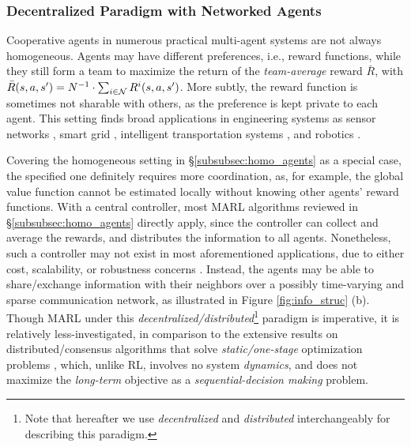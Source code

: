 

 
\subsubsection{Decentralized Paradigm with Networked Agents}\label{subsubsec:networked_paradigm}
 
Cooperative agents in  numerous  
practical multi-agent systems are not always  homogeneous. Agents may have different preferences, i.e., reward functions, while  they still form a team to maximize the return of the \emph{team-average} reward $\bar R$, with $\bar R(s,a,s')=N^{-1}\cdot\sum_{i\in\mathcal{N}}R^i(s,a,s')$. More subtly, the reward function is sometimes not sharable with others, as the preference is kept private to each agent.  
This setting finds broad applications in  engineering systems as sensor networks  \cite{rabbat2004distributed},  smart grid \cite{dall2013distributed,zhang2018dynamicpower}, intelligent transportation systems \cite{adler2002cooperative,zhang2018dynamic}, and robotics \cite{corke2005networked}. 


Covering the homogeneous  setting in \S\ref{subsubsec:homo_agents} as a special case, the specified one definitely  requires more coordination, as, for example, the  global value function  cannot be estimated locally without knowing other agents' reward functions. With a central controller, most MARL algorithms reviewed in   \S\ref{subsubsec:homo_agents}  directly apply, since the controller can collect and average the rewards, and distributes the information to all agents. Nonetheless,  such a controller may not exist in 
most aforementioned applications,  due to  either cost, scalability, or robustness concerns \cite{rabbat2004distributed,dall2013distributed,zhang2018distributedauto}. 
Instead,   the agents may be able to share/exchange information with their neighbors over  a possibly time-varying and sparse communication network, as  illustrated in    Figure \ref{fig:info_struc} (b). 
Though MARL under this \emph{decentralized/distributed}\footnote{Note that hereafter  we use \emph{decentralized} and \emph{distributed} interchangeably for describing this paradigm. } paradigm  is   imperative, it is  relatively less-investigated, in comparison to the extensive   results on distributed/consensus algorithms  that solve \emph{static/one-stage} optimization problems \cite{nedic2009distributed,agarwal2011distributed,jakovetic2011cooperative,tu2012diffusion}, which, unlike RL, involves no system \emph{dynamics}, and does not maximize the \emph{long-term}  objective as a \emph{sequential-decision making} problem. 

